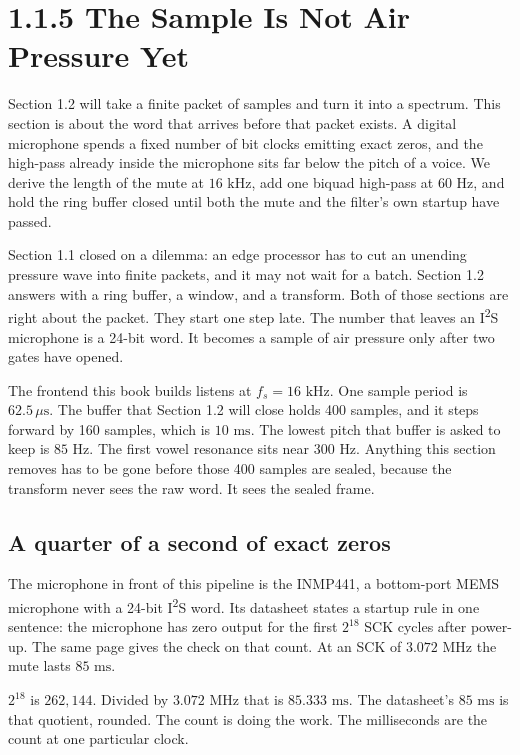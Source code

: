 \documentclass[11pt,a4paper]{article}
\begin{document}
\section*{1.1.5 The Sample Is Not Air Pressure Yet}

\begin{learningobj}
Section 1.2 will take a finite packet of samples and turn it into a spectrum. This section is about the word that arrives before that packet exists. A digital microphone spends a fixed number of bit clocks emitting exact zeros, and the high-pass already inside the microphone sits far below the pitch of a voice. We derive the length of the mute at $16\text{ kHz}$, add one biquad high-pass at $60\text{ Hz}$, and hold the ring buffer closed until both the mute and the filter's own startup have passed.
\end{learningobj}

Section 1.1 closed on a dilemma: an edge processor has to cut an unending pressure wave into finite packets, and it may not wait for a batch. Section 1.2 answers with a ring buffer, a window, and a transform. Both of those sections are right about the packet. They start one step late. The number that leaves an I\textsuperscript{2}S microphone is a 24-bit word. It becomes a sample of air pressure only after two gates have opened.

The frontend this book builds listens at $f_s = 16\text{ kHz}$. One sample period is $62.5\,\mu\text{s}$. The buffer that Section 1.2 will close holds 400 samples, and it steps forward by 160 samples, which is $10\text{ ms}$. The lowest pitch that buffer is asked to keep is $85\text{ Hz}$. The first vowel resonance sits near $300\text{ Hz}$. Anything this section removes has to be gone before those 400 samples are sealed, because the transform never sees the raw word. It sees the sealed frame.

\subsection*{A quarter of a second of exact zeros}

The microphone in front of this pipeline is the INMP441, a bottom-port MEMS microphone with a 24-bit I\textsuperscript{2}S word. Its datasheet states a startup rule in one sentence: the microphone has zero output for the first $2^{18}$ SCK cycles after power-up. The same page gives the check on that count. At an SCK of $3.072\text{ MHz}$ the mute lasts $85\text{ ms}$.

$2^{18}$ is $262{,}144$. Divided by $3.072\text{ MHz}$ that is $85.333\text{ ms}$. The datasheet's $85\text{ ms}$ is that quotient, rounded. The count is doing the work. The milliseconds are the count at one particular clock.
\end{document}
